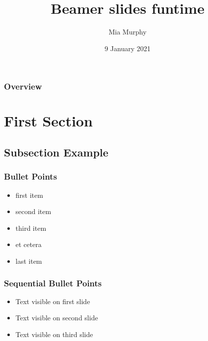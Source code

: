 \documentclass[12pt]{beamer}\usepackage[]{graphicx}\usepackage[]{color}
\title[Beamer]{Beamer slides funtime} %
\author{Mia Murphy} %
\institute[UVM] %
{
University of Vermont \\ %
Department of Funtime \\
Burlington, VT 05401 USA \\ 
\medskip
\textit{mia.murphy@uvm.edu} %
}
\date{9 January 2021} %
\begin{document}
\begin{frame}
\titlepage %
\end{frame}


\begin{frame}
\frametitle{Overview} %
\tableofcontents %
\end{frame}

\section{First Section} %

\subsection{Subsection Example} %

\begin{frame}
\frametitle{Bullet Points}
\begin{itemize}
\item first item
\item second item
\item third item
\item et cetera
\item last item
\end{itemize}
\end{frame}

\begin{frame}
\frametitle{Sequential Bullet Points}
\begin{itemize}
\item<1-> Text visible on first slide
\item<2-> Text visible on second slide
\item<3-> Text visible on third slide
\end{itemize}
\end{frame}
\end{document}
